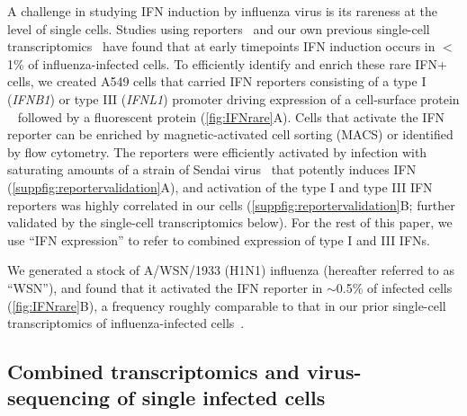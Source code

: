 \documentclass[10pt,letterpaper]{article}
\newcommand{\FIG}[1]{\autoref{fig:#1}}
\newcommand{\SUPPFIG}[1]{\autoref{suppfig:#1}}
\begin{document}
A challenge in studying IFN induction by influenza virus is its rareness at the level of single cells.
Studies using reporters~\citep{killip2017single,kallfass2013visualizing} and our own previous single-cell transcriptomics~\citep{russell2018extreme} have found that at early timepoints IFN induction occurs in $<$1\% of influenza-infected cells.
To efficiently identify and enrich these rare IFN+ cells, we created A549 cells that carried IFN reporters consisting of a type I (\textit{IFNB1}) or type III (\textit{IFNL1}) promoter driving expression of a cell-surface protein ~\citep[LNGFR$\Delta$C;][]{bonini1997hsv,ruggieri1997cell} followed by a fluorescent protein (\FIG{IFNrare}A).
Cells that activate the IFN reporter can be enriched by magnetic-activated cell sorting (MACS) or identified by flow cytometry.
The reporters were efficiently activated by infection with saturating amounts of a strain of Sendai virus~\citep{strahle2006sendai} that potently induces IFN (\SUPPFIG{reportervalidation}A), and activation of the type I and type III IFN reporters was highly correlated in our cells (\SUPPFIG{reportervalidation}B; further validated by the single-cell transcriptomics below).
For the rest of this paper, we use ``IFN expression'' to refer to combined expression of type I and III IFNs. 

We generated a stock of A/WSN/1933 (H1N1) influenza (hereafter referred to as ``WSN''), and found that it activated the IFN reporter in $\sim$0.5\% of infected cells  (\FIG{IFNrare}B), a frequency roughly comparable to that in our prior single-cell transcriptomics of influenza-infected cells~\citep{russell2018extreme}.


\subsection*{Combined transcriptomics and virus-sequencing of single infected cells}
\end{document}
